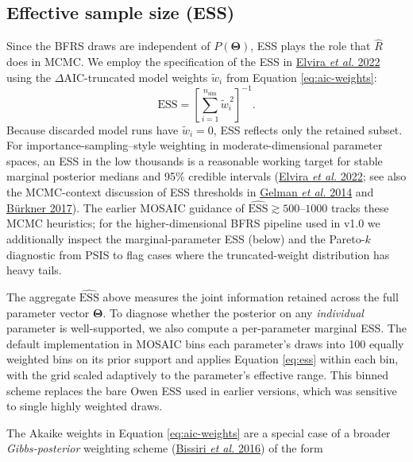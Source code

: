 \documentclass[
]{book}
\begin{document}
\subsection{Effective sample size (ESS)}\label{effective-sample-size-ess}

Since the BFRS draws are independent of \(P(\boldsymbol{\Theta})\), ESS plays
the role that \(\hat R\) does in MCMC. We employ the specification of the ESS in \href{https://onlinelibrary.wiley.com/doi/10.1111/insr.12500}{Elvira \emph{et al.} 2022} using the \(\Delta \text{AIC}\)-truncated model weights \(\tilde w_i\) from Equation \eqref{eq:aic-weights}:
\begin{equation}
\widehat{\text{ESS}} =
\left[
\sum_{i=1}^{n_{\text{sim}}} \tilde{w}_i^{\,2}
\right]^{-1}.
\label{eq:ess}
\end{equation}
Because discarded model runs have \(\tilde{w}_i=0\), ESS reflects only the retained
subset. For importance-sampling--style weighting in moderate-dimensional parameter spaces, an ESS in the low thousands is a reasonable working target for stable marginal posterior medians and 95\% credible intervals (\href{https://onlinelibrary.wiley.com/doi/10.1111/insr.12500}{Elvira \emph{et al.} 2022}; see also the MCMC-context discussion of ESS thresholds in \href{https://sites.stat.columbia.edu/gelman/book/}{Gelman \emph{et al.} 2014} and \href{https://www.jstatsoft.org/article/view/v080i01}{Bürkner 2017}). The earlier MOSAIC guidance of \(\widehat{\text{ESS}} \gtrsim 500\)--\(1000\) tracks these MCMC heuristics; for the higher-dimensional BFRS pipeline used in v1.0 we additionally inspect the marginal-parameter ESS (below) and the Pareto-\(k\) diagnostic from PSIS to flag cases where the truncated-weight distribution has heavy tails.

The aggregate \(\widehat{\text{ESS}}\) above measures the joint information retained across the full parameter vector \(\boldsymbol{\Theta}\). To diagnose whether the posterior on any \emph{individual} parameter is well-supported, we also compute a per-parameter marginal ESS. The default implementation in MOSAIC bins each parameter's draws into 100 equally weighted bins on its prior support and applies Equation \eqref{eq:ess} within each bin, with the grid scaled adaptively to the parameter's effective range. This binned scheme replaces the bare Owen ESS used in earlier versions, which was sensitive to single highly weighted draws.

The Akaike weights in Equation \eqref{eq:aic-weights} are a special case of a broader \emph{Gibbs-posterior} weighting scheme (\href{https://doi.org/10.1111/rssb.12158}{Bissiri \emph{et al.} 2016}) of the form
\end{document}
